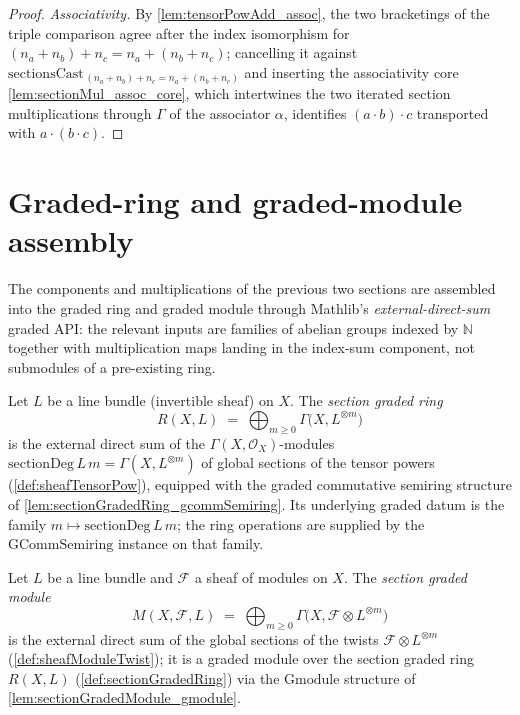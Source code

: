 \begin{proof}
  \emph{Associativity.} By \cref{lem:tensorPowAdd_assoc}, the two bracketings of
  the triple comparison agree after the index isomorphism for
  \((n_a+n_b)+n_c = n_a+(n_b+n_c)\); cancelling it against
  \(\mathrm{sectionsCast}_{\,(n_a+n_b)+n_c = n_a+(n_b+n_c)}\) and inserting the
  associativity core \cref{lem:sectionMul_assoc_core}, which intertwines the two
  iterated section multiplications through \(\Gamma\) of the associator
  \(\alpha\), identifies \((a \cdot b) \cdot c\) transported with
  \(a \cdot (b \cdot c)\).
\end{proof}

\section{Graded-ring and graded-module assembly}
\label{sec:sgr_graded_assembly}

The components and multiplications of the previous two sections are assembled
into the graded ring and graded module through Mathlib's
\emph{external-direct-sum} graded API: the relevant inputs are families of
abelian groups indexed by \(\mathbb{N}\) together with multiplication maps
landing in the index-sum component, not submodules of a pre-existing ring.

\begin{definition}
  \label{def:sectionGradedRing}
  Let \(L\) be a line bundle (invertible sheaf) on \(X\). The \emph{section
  graded ring}
  \[
    R(X, L) \;=\; \bigoplus_{m \ge 0} \Gamma\bigl(X, L^{\otimes m}\bigr)
  \]
  is the external direct sum of the \(\Gamma(X,\mathcal{O}_X)\)-modules
  \(\mathrm{sectionDeg}\,L\,m = \Gamma(X, L^{\otimes m})\) of global sections of
  the tensor powers (\cref{def:sheafTensorPow}), equipped with the graded
  commutative semiring structure of \cref{lem:sectionGradedRing_gcommSemiring}.
  Its underlying graded datum is the family
  \(m \mapsto \mathrm{sectionDeg}\,L\,m\); the ring operations are supplied by the
  \(\mathrm{GCommSemiring}\) instance on that family.
\end{definition}

\begin{definition}
  \label{def:sectionGradedModule}
  Let \(L\) be a line bundle and \(\mathcal{F}\) a sheaf of modules on \(X\). The
  \emph{section graded module}
  \[
    M(X, \mathcal{F}, L) \;=\; \bigoplus_{m \ge 0}
      \Gamma\bigl(X, \mathcal{F} \otimes L^{\otimes m}\bigr)
  \]
  is the external direct sum of the global sections of the twists
  \(\mathcal{F} \otimes L^{\otimes m}\) (\cref{def:sheafModuleTwist}); it is a
  graded module over the section graded ring \(R(X,L)\)
  (\cref{def:sectionGradedRing}) via the \(\mathrm{Gmodule}\) structure of
  \cref{lem:sectionGradedModule_gmodule}.
\end{definition}

